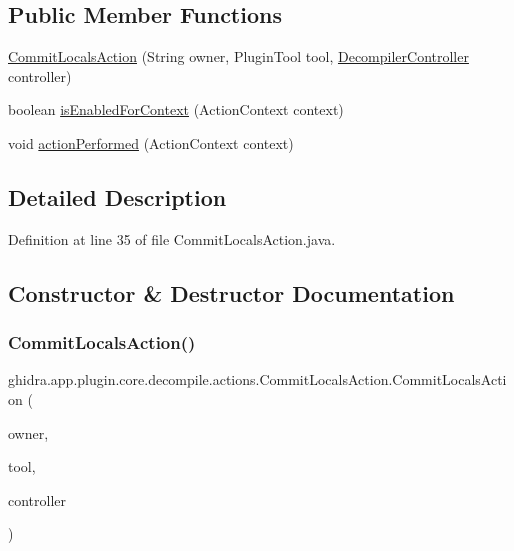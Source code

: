 \subsection*{Public Member Functions}
\begin{DoxyCompactItemize}
\item 
\mbox{\hyperlink{classghidra_1_1app_1_1plugin_1_1core_1_1decompile_1_1actions_1_1_commit_locals_action_aad3b389400bf255d5795a7a4e9839097}{Commit\+Locals\+Action}} (String owner, Plugin\+Tool tool, \mbox{\hyperlink{classghidra_1_1app_1_1decompiler_1_1component_1_1_decompiler_controller}{Decompiler\+Controller}} controller)
\item 
boolean \mbox{\hyperlink{classghidra_1_1app_1_1plugin_1_1core_1_1decompile_1_1actions_1_1_commit_locals_action_abb72f86dc1e28e94bc03d03e41743ebe}{is\+Enabled\+For\+Context}} (Action\+Context context)
\item 
void \mbox{\hyperlink{classghidra_1_1app_1_1plugin_1_1core_1_1decompile_1_1actions_1_1_commit_locals_action_a11d13853b173aba5ddb3ac594bebd924}{action\+Performed}} (Action\+Context context)
\end{DoxyCompactItemize}


\subsection{Detailed Description}


Definition at line 35 of file Commit\+Locals\+Action.\+java.



\subsection{Constructor \& Destructor Documentation}
\mbox{\label{classghidra_1_1app_1_1plugin_1_1core_1_1decompile_1_1actions_1_1_commit_locals_action_aad3b389400bf255d5795a7a4e9839097}} 
\subsubsection{\texorpdfstring{CommitLocalsAction()}{CommitLocalsAction()}}
{\footnotesize\ttfamily ghidra.\+app.\+plugin.\+core.\+decompile.\+actions.\+Commit\+Locals\+Action.\+Commit\+Locals\+Action (\begin{DoxyParamCaption}\item[{String}]{owner,  }\item[{Plugin\+Tool}]{tool,  }\item[{\mbox{\hyperlink{classghidra_1_1app_1_1decompiler_1_1component_1_1_decompiler_controller}{Decompiler\+Controller}}}]{controller }\end{DoxyParamCaption})\hspace{0.3cm}{\ttfamily [inline]}}




